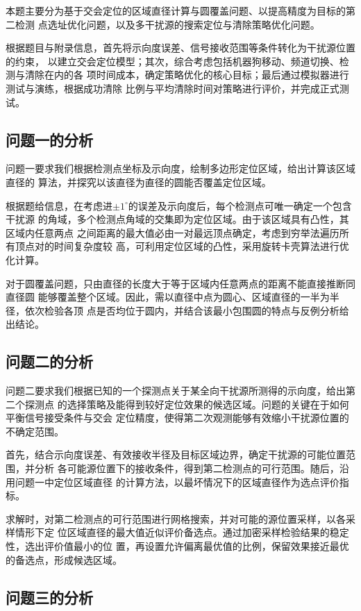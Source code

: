 \documentclass[withoutpreface,bwprint]{cumcmthesis} %
\begin{document}
本题主要分为基于交会定位的区域直径计算与圆覆盖问题、以提高精度为目标的第二检测
点选址优化问题，以及多干扰源的搜索定位与清除策略优化问题。

根据题目与附录信息，首先将示向度误差、信号接收范围等条件转化为干扰源位置的约束，
以建立交会定位模型；其次，综合考虑包括机器狗移动、频道切换、检测与清除在内的各
项时间成本，确定策略优化的核心目标；最后通过模拟器进行测试与演练，根据成功清除
比例与平均清除时间对策略进行评价，并完成正式测试。

\subsection{问题一的分析}

问题一要求我们根据检测点坐标及示向度，绘制多边形定位区域，给出计算该区域直径的
算法，并探究以该直径为直径的圆能否覆盖定位区域。

根据题给信息，在考虑进$\pm 1^\circ$的误差及示向度后，每个检测点可唯一确定一个包含干扰源
的角域，多个检测点角域的交集即为定位区域。由于该区域具有凸性，其区域内任意两点
之间距离的最大值必由一对最远顶点确定，考虑到穷举法遍历所有顶点对的时间复杂度较
高，可利用定位区域的凸性，采用旋转卡壳算法进行优化计算。

对于圆覆盖问题，只由直径的长度大于等于区域内任意两点的距离不能直接推断同直径圆
能够覆盖整个区域。因此，需以直径中点为圆心、区域直径的一半为半径，依次检验各顶
点是否均位于圆内，并结合该最小包围圆的特点与反例分析给出结论。

\subsection{问题二的分析}

问题二要求我们根据已知的一个探测点关于某全向干扰源所测得的示向度，给出第二个探测点
的选择策略及能得到较好定位效果的候选区域。问题的关键在于如何平衡信号接受条件与交会
定位精度，使得第二次观测能够有效缩小干扰源位置的不确定范围。

首先，结合示向度误差、有效接收半径及目标区域边界，确定干扰源的可能位置范围，并分析
各可能源位置下的接收条件，得到第二检测点的可行范围。随后，沿用问题一中定位区域直径
的计算方法，以最坏情况下的区域直径作为选点评价指标。

求解时，对第二检测点的可行范围进行网格搜索，并对可能的源位置采样，以各采样情形下定
位区域直径的最大值近似评价备选点。通过加密采样检验结果的稳定性，选出评价值最小的位
置，再设置允许偏离最优值的比例，保留效果接近最优的备选点，形成候选区域。

\subsection{问题三的分析}
\end{document}
